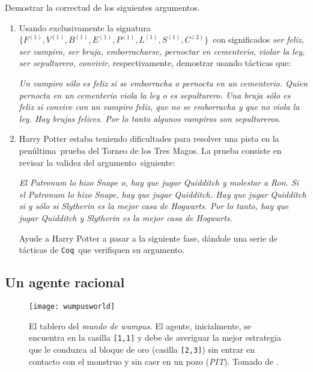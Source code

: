 \documentclass[paper=letter, fontsize=12pt]{scrartcl}
\begin{document}
\noindent
Demostrar la correctud de los siguientes argumentos.

\begin{enumerate}[resume]
\item Usando exclusivamente la signatura $\{F^{(1)}, V^{(1)}, B^{(1)}, E^{(1)}, P^{(1)}, L^{(1)}, S^{(1)}, C^{(2)}\}$\
  con significados \textit{ser feliz, ser vampiro, ser bruja, emborracharse, pernoctar en cementerio,}
  \textit{violar la ley, ser sepulturero, convivir}, respectivamente, demostrar usando tácticas que:
  \begin{center}
    \textit{
      Un vampiro sólo es feliz si se emborracha o pernocta en un cementerio. Quien pernocta en un
      cementerio viola la ley o es sepulturero. Una bruja sólo es feliz si convive con un vampiro feliz,
      que no se emborracha y que no viola la ley. Hay brujas felices. Por lo tanto algunos vampiros
      son sepultureros.
    }
  \end{center}
\item Harry Potter estaba teniendo dificultades para resolver una pista en la penúltima\
  prueba del Torneo de los Tres Magos. La prueba consiste en revisar la validez del argumento\
  siguiente:
    \begin{center}
      \textit{
        El Patronum lo hizo Snape o, hay que jugar Quidditch y molestar a Ron. Si el
        Patronum lo hizo Snape, hay que jugar Quidditch. Hay que jugar Quidditch si y sólo si
        Slytherin es la mejor casa de Hogwarts. Por lo tanto, hay que jugar Quidditch y Slytherin
        es la mejor casa de Hogwarts.
      }
    \end{center}
    Ayude a Harry Potter a pasar a la siguiente fase, dándole una serie de tácticas de \verb+Coq+\
    que verifiquen su argumento.
\end{enumerate}

\subsection{Un agente racional}

\begin{figure}[h]
  \centering
  \texttt{[image: wumpusworld]}
  \caption[CAPTION WUMPUS]{
    El tablero del \emph{mundo de wumpus}. El agente, inicialmente, se encuentra en la
    casilla \texttt{[1,1]} y debe de averiguar la mejor estrategia que le conduzca al
    bloque de oro (casilla \texttt{[2,3]}) sin entrar en contacto con el monstruo y
    sin caer en un pozo (\emph{PIT}). Tomado de \footnotemark.
  }
  \label{wumpusfig}
\end{figure}
\end{document}
